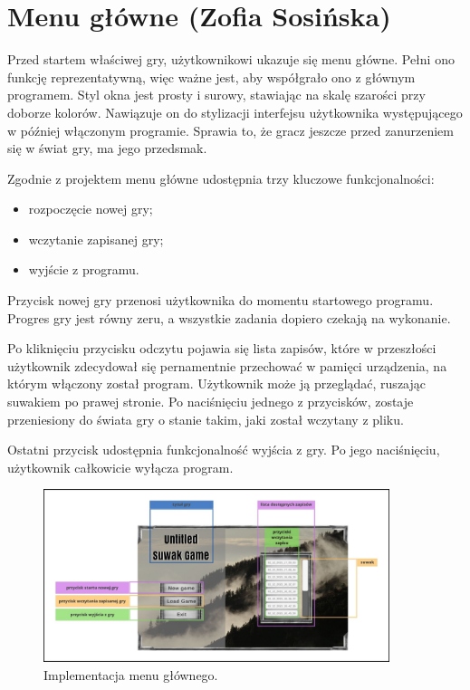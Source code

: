 \section{Menu główne (Zofia Sosińska)}\label{chap:menu_main}
Przed startem właściwej gry, użytkownikowi ukazuje się menu główne. Pełni ono funkcję reprezentatywną, więc ważne jest, aby współgrało ono z głównym programem.
Styl okna jest prosty i surowy, stawiając na skalę szarości przy doborze kolorów. Nawiązuje on do stylizacji interfejsu użytkownika występującego 
w później włączonym programie. Sprawia to, że gracz jeszcze przed zanurzeniem się w świat gry, ma jego przedsmak.

Zgodnie z projektem menu główne udostępnia trzy kluczowe funkcjonalności:
\begin{itemize}
    \item rozpoczęcie nowej gry;
    \item wczytanie zapisanej gry;
    \item wyjście z programu.
\end{itemize}

Przycisk nowej gry przenosi użytkownika do momentu startowego programu. Progres gry jest równy zeru, a wszystkie zadania dopiero czekają na wykonanie.

Po kliknięciu przycisku odczytu pojawia się lista zapisów, które w przeszłości użytkownik zdecydował się pernamentnie przechować w pamięci urządzenia, na którym
włączony został program. Użytkownik może ją przeglądać, ruszając suwakiem po prawej stronie. Po naciśnięciu jednego z przycisków, zostaje przeniesiony 
do świata gry o stanie takim, jaki został wczytany z pliku.

Ostatni przycisk udostępnia funkcjonalność wyjścia z gry. Po jego naciśnięciu, użytkownik całkowicie wyłącza program.
\begin{figure}[htbp]
    \centering
    \includegraphics[width=0.9\textwidth]{images/ui/main_menu.png}
    \caption{Implementacja menu głównego.
    }\label{fig:compass}
\end{figure}